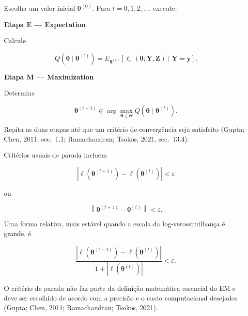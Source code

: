 \documentclass[
  letterpaper,
  DIV=11,
  numbers=noendperiod]{scrreprt}
\begin{document}
\begin{tcolorbox}[enhanced jigsaw, colback=white, leftrule=.75mm, colbacktitle=quarto-callout-important-color!10!white, breakable, titlerule=0mm, bottomtitle=1mm, title=\textcolor{quarto-callout-important-color}{\faExclamation}\hspace{0.5em}{Definição --- algoritmo EM}, colframe=quarto-callout-important-color-frame, toprule=.15mm, opacityback=0, bottomrule=.15mm, opacitybacktitle=0.6, arc=.35mm, toptitle=1mm, rightrule=.15mm, coltitle=black, left=2mm]

Escolha um valor inicial \(\boldsymbol{\theta}^{(0)}\). Para
\(t=0,1,2,\ldots\), execute:

\textbf{Etapa E --- Expectation}

Calcule

\[Q(\boldsymbol{\theta}\mid\boldsymbol{\theta}^{(t)})
=
E_{\boldsymbol{\theta}^{(t)}}
\left[
\ell_c(\boldsymbol{\theta};\boldsymbol{Y},\boldsymbol{Z})
\mid
\boldsymbol{Y}=\boldsymbol{y}
\right].\]

\textbf{Etapa M --- Maximization}

Determine

\[\boldsymbol{\theta}^{(t+1)}
\in
\arg\max_{\boldsymbol{\theta}\in\Theta}
Q(\boldsymbol{\theta}\mid\boldsymbol{\theta}^{(t)}).\]

Repita as duas etapas até que um critério de convergência seja
satisfeito (Gupta; Chen, 2011, sec.~1.1; Ramachandran; Tsokos, 2021,
sec.~13.4).

\end{tcolorbox}

Critérios usuais de parada incluem

\[\left|
\ell(\boldsymbol{\theta}^{(t+1)})
-
\ell(\boldsymbol{\theta}^{(t)})
\right|
<\varepsilon\]

ou

\[\left\|
\boldsymbol{\theta}^{(t+1)}
-
\boldsymbol{\theta}^{(t)}
\right\|
<\varepsilon.\]

Uma forma relativa, mais estável quando a escala da log-verossimilhança
é grande, é

\[\frac{
\left|
\ell(\boldsymbol{\theta}^{(t+1)})
-
\ell(\boldsymbol{\theta}^{(t)})
\right|
}{
1+\left|\ell(\boldsymbol{\theta}^{(t)})\right|
}
<\varepsilon.\]

O critério de parada não faz parte da definição matemática essencial do
EM e deve ser escolhido de acordo com a precisão e o custo computacional
desejados (Gupta; Chen, 2011; Ramachandran; Tsokos, 2021).
\end{document}
